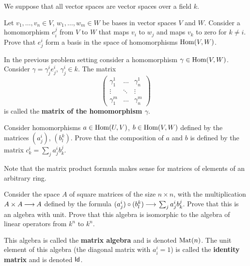 \documentclass[12pt]{article}
\begin{document}



We suppose that all vector spaces are vector spaces over a field $k$. 

\begin{zadacha}
Let $v_1, \dots, v_n\in V$, $w_1, \dots, w_m\in W$ be bases in 
vector spaces $V$ and $W$.  Consider a homomorphism $e_i^j$ from $V$
to $W$ that maps $v_i$ to $w_j$ and maps $v_k$ to zero for
$k \neq i$. Prove that $e^i_j$ form a basis in the space of
homomorphisms $\operatorname{Hom}(V,W)$. 
\end{zadacha}

\begin{opredelenie}
In the previous problem setting consider a homomorphism $\gamma\in
\operatorname{Hom}(V,W)$. Consider
$\gamma= \gamma^i_j e^i_j$, $\gamma^i_j \in k$.
The matrix
$$
\begin{pmatrix}
\gamma^1_1 & \dots & \gamma^1_n\\
\vdots & \ddots & \vdots\\
\gamma^m_1 & \dots & \gamma^m_n
\end{pmatrix}
$$
is called the {\bf matrix of the homomorphism $\gamma$}.
\end{opredelenie}

\begin{zadacha}
Consider homomorphisms $a\in \operatorname{Hom}(U,V)$, $b\in \operatorname{Hom}(V,W)$
defined by the matrices $(a^i_j)$, $(b^k_l)$. Prove that the
composition of $a$ and $b$ is defined by the matrix $c^i_k =
\sum_{j} a^i_j b^j_k$.
\end{zadacha}

\begin{zamechanie}
Note that the matrix product formula makes sense for matrices of
elements of an arbitrary ring.
\end{zamechanie}

\begin{zadacha}
Consider the space $A$ of square matrices of the size $n\times n$,
with the multiplication $A\times A {\:\longrightarrow\:} A$ defined by the
formula $(a^i_j)\circ (b^k_l){\:\longrightarrow\:} \sum_{j} a^i_j b^j_k$.
Prove that this is an algebra with unit. Prove that this algebra is
isomorphic to the algebra of linear operators from $k^n$ to $k^n$. 
\end{zadacha}

\begin{opredelenie}
This algebra is called the {\bf matrix algebra} and is denoted
$\operatorname{Mat}(n)$.  The unit element of this algebra (the diagonal matrix
with $a_i^i=1$) is called the {\bf identity matrix} and is denoted 
$\operatorname{\sf Id}$.
\end{opredelenie}
\end{document}
